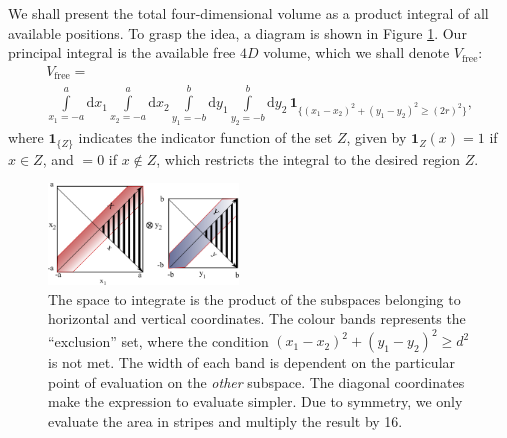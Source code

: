 \documentclass[letterpaper,10pt, jcp, aps]{revtex4-1}
\newcommand{\rd}{\!\mathrm{d}}
\newcommand{\indicator}[1]{\mathbf{1}_{ \{   #1 \} } }
\begin{document}
We shall present the total four-dimensional volume as a product integral
of all available positions. To grasp the idea, a 
diagram is shown in Figure \ref{diagintegra01}. Our
principal integral is the available free $4D$ volume, which 
we shall denote $V_\text{free}$:
\begin{multline}\label{volindic}
 V_\text{free} = \\ \int\limits_{x_1 = -a}^a \rd x_1 \int\limits_{x_2 = -a}^a \rd x_2 
\int\limits_{y_1 = -b}^b \rd y_1 \int\limits_{y_2 = -b}^b \rd y_2 \, \indicator{ (x_1-x_2)^2 + (y_1-y_2)^2 \ge (2r)^2 },
\end{multline}
where $\indicator{Z}$ indicates the indicator function of the set $Z$, 
given by $\mathbf{1}_Z (x) = 1$ if $x \in Z$, and $=0$ if $x \notin Z$, 
which restricts the integral to the desired region $Z$.
\begin{figure}[h]
  \begin{center}
    \includegraphics[width=0.45\textwidth]{FigurasPerfectas/diagramintegra01.pdf}
  \end{center}
  \caption{The space to integrate is the product of the subspaces
    belonging to horizontal and vertical coordinates. The colour
    bands represents the ``exclusion'' set, where the condition 
    $ (x_1-x_2)^2 + (y_1-y_2)^2 \ge d^2 $ is not met. 
    The width of each band is dependent on the particular 
    point of evaluation
    on the \emph{other} subspace. The diagonal coordinates
    make the expression to evaluate simpler. Due to 
    symmetry, we only evaluate the area in stripes and
    multiply the result by 16.}\label{diagintegra01}  
\end{figure}
\end{document}
